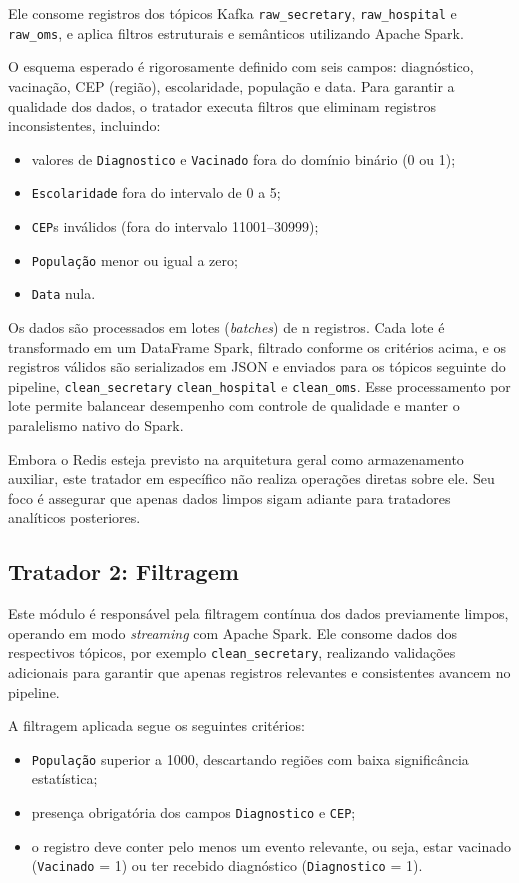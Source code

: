 \documentclass[a4paper,12pt]{article}
\begin{document}
Ele consome registros dos tópicos Kafka \texttt{raw\_secretary}, \texttt{raw\_hospital} e \texttt{raw\_oms}, e aplica filtros estruturais e semânticos utilizando Apache Spark.

O esquema esperado é rigorosamente definido com seis campos: diagnóstico, vacinação, CEP (região), escolaridade, população e data. Para garantir a qualidade dos dados, o tratador executa filtros que eliminam registros inconsistentes, incluindo:
\begin{itemize}
    \item valores de \texttt{Diagnostico} e \texttt{Vacinado} fora do domínio binário (0 ou 1);
    \item \texttt{Escolaridade} fora do intervalo de 0 a 5;
    \item \texttt{CEP}s inválidos (fora do intervalo 11001--30999);
    \item \texttt{População} menor ou igual a zero;
    \item \texttt{Data} nula.
\end{itemize}

Os dados são processados em lotes (\textit{batches}) de n registros. Cada lote é transformado em um DataFrame Spark, filtrado conforme os critérios acima, e os registros válidos são serializados em JSON e enviados para os tópicos seguinte do pipeline,  \texttt{clean\_secretary} \texttt{clean\_hospital} e \texttt{clean\_oms}. Esse processamento por lote permite balancear desempenho com controle de qualidade e manter o paralelismo nativo do Spark.

Embora o Redis esteja previsto na arquitetura geral como armazenamento auxiliar, este tratador em específico não realiza operações diretas sobre ele. Seu foco é assegurar que apenas dados limpos sigam adiante para tratadores analíticos posteriores.



\subsection{Tratador 2: Filtragem}

Este módulo é responsável pela filtragem contínua dos dados previamente limpos, operando em modo \textit{streaming} com Apache Spark. Ele consome dados dos respectivos tópicos, por exemplo \texttt{clean\_secretary}, realizando validações adicionais para garantir que apenas registros relevantes e consistentes avancem no pipeline.

A filtragem aplicada segue os seguintes critérios:
\begin{itemize}
    \item \texttt{População} superior a 1000, descartando regiões com baixa significância estatística;
    \item presença obrigatória dos campos \texttt{Diagnostico} e \texttt{CEP};
    \item o registro deve conter pelo menos um evento relevante, ou seja, estar vacinado (\texttt{Vacinado} = 1) ou ter recebido diagnóstico (\texttt{Diagnostico} = 1).
\end{itemize}
\end{document}
